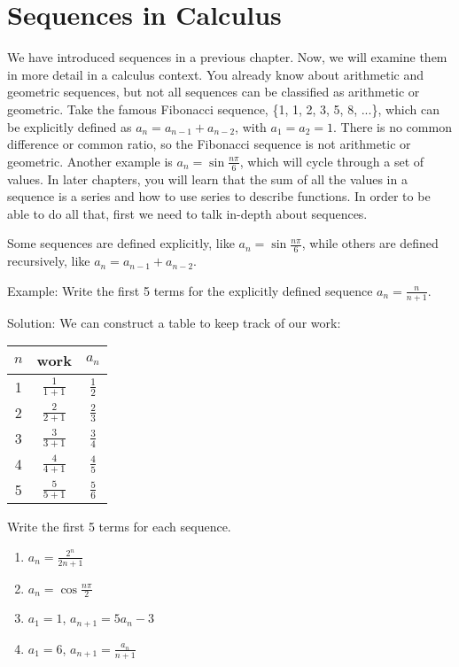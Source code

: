 \chapter{Sequences in Calculus}

We have introduced sequences in a previous chapter. Now, we will examine them in more detail in a calculus context. You already know about arithmetic and geometric sequences, but not all sequences can be classified as arithmetic or geometric. Take the famous Fibonacci sequence, \{1, 1, 2, 3, 5, 8, ...\}, which can be explicitly defined as $a_n = a_{n-1} + a_{n-2}$, with $a_1 = a_2 = 1$. There is no common difference or common ratio, so the Fibonacci sequence is not arithmetic or geometric. Another example is $a_n = \sin{\frac{n\pi}{6}}$, which will cycle through a set of values. In later chapters, you will learn that the sum of all the values in a sequence is a series and how to use series to describe functions. In order to be able to do all that, first we need to talk in-depth about sequences. 

Some sequences are defined explicitly, like $a_n = \sin{\frac{n\pi}{6}}$, while others are defined recursively, like $a_n = a_{n-1} + a_{n-2}$. 

Example: Write the first 5 terms for the explicitly defined sequence $a_n = \frac{n}{n+1}$.

Solution: We can construct a table to keep track of our work:
\begin{center}
\begin{tabular}{|c|c|c|}\hline
$n$ & work & $a_n$\\
\hline
1 & $\frac{1}{1+1}$ & $\frac{1}{2}$\\
\hline
2 & $\frac{2}{2+1}$ & $\frac{2}{3}$\\
\hline
3 & $\frac{3}{3+1}$ & $\frac{3}{4}$\\
\hline
4 & $\frac{4}{4+1}$ & $\frac{4}{5}$\\
\hline
5 & $\frac{5}{5+1}$ & $\frac{5}{6}$\\
\hline
\end{tabular}
\end{center}

\begin{Exercise}[label = seqcalc1]
Write the first 5 terms for each sequence. 
\begin{enumerate}
\item $a_n = \frac{2^n}{2n+1}$
\item $a_n = \cos{\frac{n\pi}{2}}$
\item $a_1 = 1$, $a_{n+1} = 5a_n-3$
\item $a_1 = 6$, $a_{n+1} = \frac{a_n}{n+1}$
\end{enumerate}
\end{Exercise}

